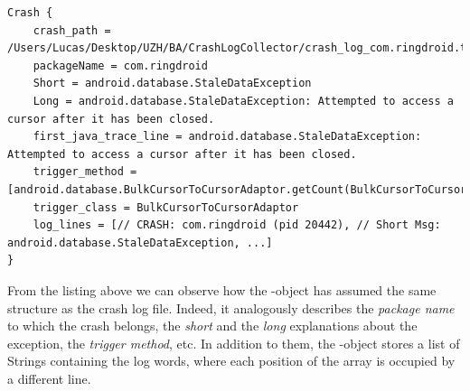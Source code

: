 \begin{lstlisting}[caption=\Crash-object,basicstyle=\fontsize{6}{8}\ttfamily, label={lst: crashobject}]
Crash {
	crash_path = /Users/Lucas/Desktop/UZH/BA/CrashLogCollector/crash_log_com.ringdroid.txt
	packageName = com.ringdroid
	Short = android.database.StaleDataException
	Long = android.database.StaleDataException: Attempted to access a cursor after it has been closed.
	first_java_trace_line = android.database.StaleDataException: Attempted to access a cursor after it has been closed.
	trigger_method = [android.database.BulkCursorToCursorAdaptor.getCount(BulkCursorToCursorAdaptor.java:70)]
	trigger_class = BulkCursorToCursorAdaptor
	log_lines = [// CRASH: com.ringdroid (pid 20442), // Short Msg: android.database.StaleDataException, ...]
}
\end{lstlisting}
From the listing above we can observe how the \Crash-object has assumed the same structure as the crash log file. Indeed, it analogously describes the \textit{package name} to which the crash belongs, the \textit{short} and the \textit{long} explanations about the exception, the \textit{trigger method}, etc.
In addition to them, the \Crash-object stores a list of Strings containing the log words, where each position of the array is occupied by a different line. 
